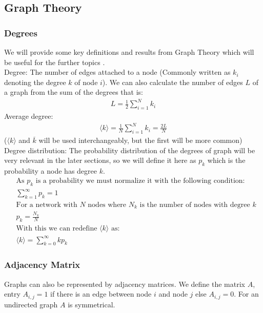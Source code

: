 \documentclass{article}
\begin{document}
        \subsection{Graph Theory}
            \subsubsection{Degrees}
            We will provide some key definitions and results from Graph Theory which will be useful for the further topics \parencite{barabasi2013network}.\\
            Degree: The number of edges attached to a node (Commonly written as $k_i$ denoting the degree $k$ of node $i$). We can also calculate the number of edges $L$ of a graph from the sum of the degrees that is: 
            \begin{align*}
                L=\frac{1}{2}\sum_{i=1}^{N} k_{i}
            \end{align*}
            Average degree:
            \begin{align*}
                \langle k \rangle = \frac{1}{N} \sum_{i=1}^{N}k_{i} = \frac{2L}{N}
            \end{align*}
            ($\langle k \rangle$ and $\overline{k}$ will be used interchangeably, but the first will be more common)
            Degree distribution: The probability distribution of the degrees of graph will be very relevant in the later sections, so we will define it here as $p_k$ which is the probability a node has degree $k$.
            \begin{align*}
                &\text{As $p_k$ is a probability we must normalize it with the following condition:}\\
                &\sum_{k=1}^{\infty}p_{k} = 1\\
                &\text{For a network with $N$ nodes where $N_k$ is the number of nodes with degree $k$}\\
                &p_{k} = \frac{N_k}{N}\\
                &\text{With this we can redefine $\langle k \rangle$ as:}\\
                &\langle k \rangle = \sum_{k=0}^{\infty}kp_{k}
            \end{align*}
        \subsubsection{Adjacency Matrix}
            Graphs can also be represented by adjacency matrices. We define the matrix $A$, entry $A_{i,j} = 1$ if there is an edge between node $i$ and node $j$ else $A_{i,j} = 0$. For an undirected graph $A$ is symmetrical.\\
\end{document}

